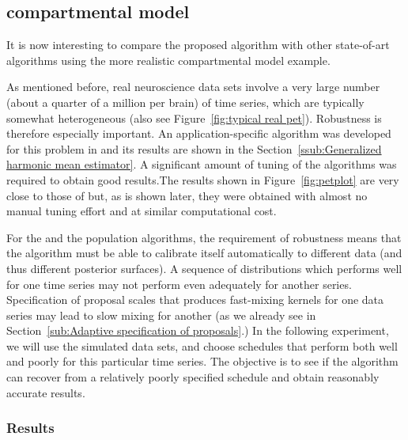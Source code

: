 \subsection{\protect\pet compartmental model}
\label{sub:pet compartmental model}

It is now interesting to compare the proposed algorithm with other
state-of-art algorithms using the more realistic \pet compartmental model
example.

As mentioned before, real neuroscience data sets involve a very large number
(about a quarter of a million per brain) of time series, which are typically
somewhat heterogeneous (also see Figure~\ref{fig:typical real pet}).
Robustness is therefore especially important. An application-specific \mcmc
algorithm was developed for this problem in \cite{Zhou2013} and its results
are shown in the Section~\ref{ssub:Generalized harmonic mean estimator}. A
significant amount of tuning of the algorithms was required to obtain good
results.The results shown in Figure~\ref{fig:petplot} are very close to those
of \cite{Zhou2013} but, as is shown later, they were obtained with almost no
manual tuning effort and at similar computational cost.

For the \smc and the population \mcmc algorithms, the requirement of
robustness means that the algorithm must be able to calibrate itself
automatically to different data (and thus different posterior surfaces). A
sequence of distributions which performs well for one time series may not
perform even adequately for another series. Specification of proposal scales
that produces fast-mixing kernels for one data series may lead to slow mixing
for another (as we already see in Section~\ref{sub:Adaptive specification of
  proposals}.) In the following experiment, we will use the simulated data
sets, and choose schedules that perform both well and poorly for this
particular time series. The objective is to see if the algorithm can recover
from a relatively poorly specified schedule and obtain reasonably accurate
results.

\subsubsection{Results}

